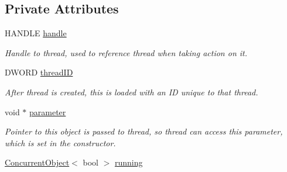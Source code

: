 \subsection*{Private Attributes}
\begin{DoxyCompactItemize}
\item 
\hypertarget{class_thread_single_a20c437b8adfc738a957ce1822e193df7}{
HANDLE \hyperlink{class_thread_single_a20c437b8adfc738a957ce1822e193df7}{handle}}
\label{class_thread_single_a20c437b8adfc738a957ce1822e193df7}

\begin{DoxyCompactList}\small\item\em Handle to thread, used to reference thread when taking action on it. \item\end{DoxyCompactList}\item 
\hypertarget{class_thread_single_a1b9939199a945bfebe7a28570ee13870}{
DWORD \hyperlink{class_thread_single_a1b9939199a945bfebe7a28570ee13870}{threadID}}
\label{class_thread_single_a1b9939199a945bfebe7a28570ee13870}

\begin{DoxyCompactList}\small\item\em After thread is created, this is loaded with an ID unique to that thread. \item\end{DoxyCompactList}\item 
\hypertarget{class_thread_single_ad0aa14d604bca6bb1ba5ec5721cd859c}{
void $\ast$ \hyperlink{class_thread_single_ad0aa14d604bca6bb1ba5ec5721cd859c}{parameter}}
\label{class_thread_single_ad0aa14d604bca6bb1ba5ec5721cd859c}

\begin{DoxyCompactList}\small\item\em Pointer to this object is passed to thread, so thread can access this parameter, which is set in the constructor. \item\end{DoxyCompactList}\item 
\hypertarget{class_thread_single_ae8d457b71b1212477ac7b1215133f91d}{
\hyperlink{class_concurrent_object}{ConcurrentObject}$<$ bool $>$ \hyperlink{class_thread_single_ae8d457b71b1212477ac7b1215133f91d}{running}}
\label{class_thread_single_ae8d457b71b1212477ac7b1215133f91d}


\end{DoxyCompactItemize}
